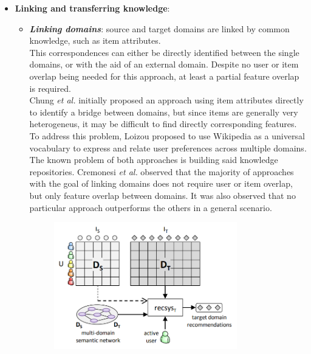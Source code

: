 \begin{itemize}
\begin{itemize}
\begin{figure}[hbt]
  \caption
  [Representation of the \textit{combining-single-domain-recommendations} approach. Source: https://doi.org/10.1007/978-1-4899-7637-6\_27]  
  {\protect\raggedright Representation of the \textit{combining-single-domain-recommendations} approach. Source: https://doi.org/10.1007/978-1-4899-7637-6\_27}
\end{figure}
\end{itemize}
\item \textbf{Linking and transferring knowledge}:
\begin{itemize}
\item \textbf{\textit{Linking domains}}: source and target domains are linked by common knowledge, such as item attributes.\\
This correspondences can either be directly identified between the single domains, or with the aid of an external domain. Despite no user or item overlap being needed for this approach, at least a partial feature overlap is required.\\
Chung \textit{et al.} \cite{10.1145/1282100.1282113} initially proposed an approach using item attributes directly to identify a bridge between domains, but since items are generally very heterogeneus, it may be difficult to find directly corresponding features. To address this problem, Loizou \cite{crossdomain-recsys-categorization} proposed to use Wikipedia as a universal vocabulary to express and relate user preferences across multiple domains.\\
The known problem of both approaches is building said knowledge repositories. Cremonesi \textit{et al.} \cite{10.1007/978-1-4899-7637-6_27} observed that the majority of approaches with the goal of linking domains does not require user or item overlap, but only feature overlap between domains. It was also observed that no particular approach outperforms the others in a general scenario.
\begin{figure}[hbt]
  \centering
  \includegraphics[width=0.8\textwidth]{pictures/linking-domains}

\end{figure}
\end{itemize}
\end{itemize}
